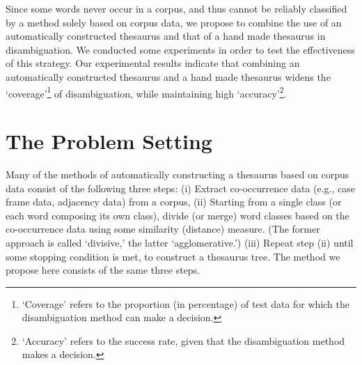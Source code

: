 Since some words never occur in a corpus, and thus cannot be reliably
classified by a method solely based on corpus data, we propose to
combine the use of an automatically constructed thesaurus and that of
a hand made thesaurus in disambiguation. We conducted some experiments
in order to test the effectiveness of this strategy. Our experimental
results indicate that combining an automatically constructed thesaurus
and a hand made thesaurus widens the `coverage'\footnote{`Coverage'
  refers to the proportion (in percentage) of test data for which the
  disambiguation method can make a decision.} of disambiguation, while
maintaining high `accuracy'\footnote{`Accuracy' refers to the success
  rate, given that the disambiguation method makes a decision.}.

\section{The Problem Setting}
Many of the methods of automatically constructing a thesaurus based on
corpus data consist of the following three steps: (i) Extract
co-occurrence data (e.g., case frame data, adjacency data) from a
corpus, (ii) Starting from a single class (or each word composing its
own class), divide (or merge) word classes based on the co-occurrence
data using some similarity (distance) measure. (The former approach is
called `divisive,' the latter `agglomerative.') (iii) Repeat step (ii)
until some stopping condition is met, to construct a thesaurus tree. 
The method we propose here consists of the same three steps.

